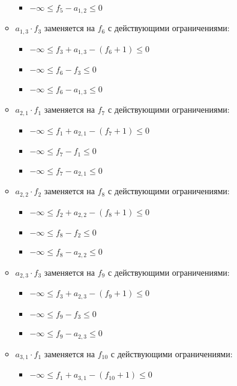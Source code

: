 \begin{enumerate}
\begin{itemize}
\begin{itemize}
      \item[] $-\infty \le f_{5} - a_{1,2} \le 0$ %
    \end{itemize}
    \item $a_{1, 3} \cdot f_{3}$ заменяется на $f_{6}$ с действующими ограничениями:
    \begin{itemize}
      \item[] $-\infty \le f_{3} + a_{1,3} - (f_{6} + 1) \le 0$ %
      \item[] $-\infty \le f_{6} - f_{3} \le 0$ %
      \item[] $-\infty \le f_{6} - a_{1,3} \le 0$ %
    \end{itemize}
    \item $a_{2, 1} \cdot f_{1}$ заменяется на $f_{7}$ с действующими ограничениями:
    \begin{itemize}
      \item[] $-\infty \le f_{1} + a_{2,1} - (f_{7} + 1) \le 0$ %
      \item[] $-\infty \le f_{7} - f_{1} \le 0$ %
      \item[] $-\infty \le f_{7} - a_{2,1} \le 0$ %
    \end{itemize}
    \item $a_{2, 2} \cdot f_{2}$ заменяется на $f_{8}$ с действующими ограничениями:
    \begin{itemize}
      \item[] $-\infty \le f_{2} + a_{2,2} - (f_{8} + 1) \le 0$ %
      \item[] $-\infty \le f_{8} - f_{2} \le 0$ %
      \item[] $-\infty \le f_{8} - a_{2,2} \le 0$ %
    \end{itemize}
    \item $a_{2, 3} \cdot f_{3}$ заменяется на $f_{9}$ с действующими ограничениями:
    \begin{itemize}
      \item[] $-\infty \le f_{3} + a_{2,3} - (f_{9} + 1) \le 0$ %
      \item[] $-\infty \le f_{9} - f_{3} \le 0$ %
      \item[] $-\infty \le f_{9} - a_{2,3} \le 0$ %
    \end{itemize}
    \item $a_{3, 1} \cdot f_{1}$ заменяется на $f_{10}$ с действующими ограничениями:
    \begin{itemize}
      \item[] $-\infty \le f_{1} + a_{3,1} - (f_{10} + 1) \le 0$ %

\end{itemize}
\end{itemize}
\end{enumerate}
